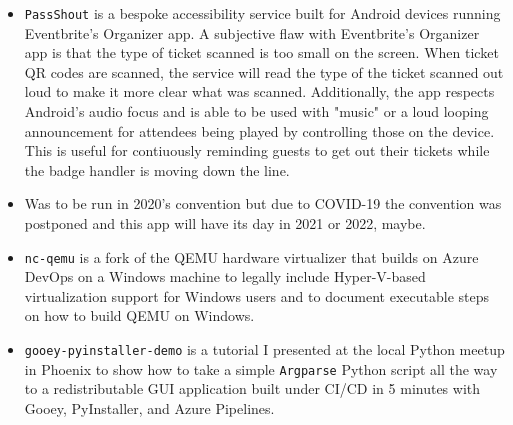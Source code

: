 \documentclass[10pt,letter,ragged2e]{altacv}
\begin{document}
\begin{paracol}{2}
\divider


\begin{itemize}
\item \texttt{PassShout} is a bespoke accessibility service built for Android devices running Eventbrite's Organizer app. A subjective flaw with Eventbrite's Organizer app is that the type of ticket scanned is too small on the screen. When ticket QR codes are scanned, the service will read the type of the ticket scanned out loud to make it more clear what was scanned. Additionally, the app respects Android's audio focus and is able to be used with "music" or a loud looping announcement for attendees being played by controlling those on the device. This is useful for contiuously reminding guests to get out their tickets while the badge handler is moving down the line.
\item Was to be run in 2020's convention but due to COVID-19 the convention was postponed and this app will have its day in 2021 or 2022, maybe.
\end{itemize}

\divider


\begin{itemize}
\item \texttt{nc-qemu} is a fork of the QEMU hardware virtualizer that builds on Azure DevOps on a Windows machine to legally include Hyper-V-based virtualization support for Windows users and to document executable steps on how to build QEMU on Windows. 
\end{itemize}

\divider


\begin{itemize}
\item \texttt{gooey-pyinstaller-demo} is a tutorial I presented at the local Python meetup in Phoenix to show how to take a simple \texttt{Argparse} Python script all the way to a redistributable GUI application built under CI/CD in 5 minutes with Gooey, PyInstaller, and Azure Pipelines. 
\end{itemize}




\end{paracol}
\end{document}
